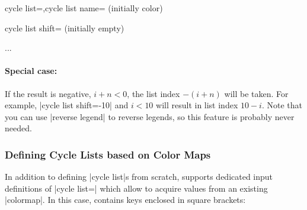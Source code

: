 \begin{pgfplotskeylist}{cycle list=,cycle list name= (initially color)}
\begin{pgfplotskey}{cycle list shift= (initially empty)}
\begin{codeexample}
    \pgfplotsset{cycle list shift=-1}
\addplot ...
\end{codeexample}

        \paragraph{Special case:}

        If the result is negative, $i+n <0$, the list index $-(i+n)$ will be
        taken. For example, |cycle list shift=-10| and $i<10$ will result in
        list index $10-i$. Note that you can use |reverse legend| to reverse
        legends, so this feature is probably never needed.
    \end{pgfplotskey}


    \subsubsection{Defining Cycle Lists based on Color Maps}

    In addition to defining |cycle list|s from scratch, \PGFPlots{} supports
    dedicated input definitions of |cycle list=| which allow to
    acquire values from an existing |colormap|. In this case, 
    contains keys enclosed in square brackets:

{%

}
\end{pgfplotskeylist}

